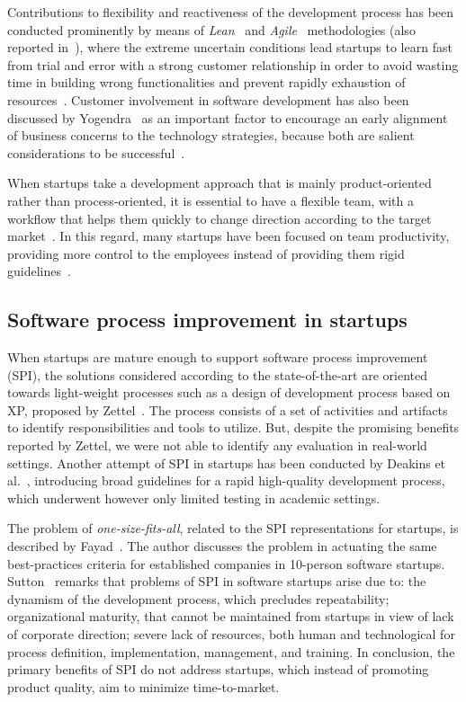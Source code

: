 \documentclass[10pt,journal,letterpaper,compsoc]{IEEEtran}
\begin{document}
Contributions to flexibility and reactiveness of the development process has 
been conducted prominently by means of \textit{Lean}~\cite{Gautam2008} and 
\textit{Agile}~\cite{Abrahamsson2002} methodologies (also reported 
in~\cite{Taipale2010, Kuvinka2011}), where the extreme uncertain conditions lead 
startups to learn fast from trial and error with a strong customer 
relationship in order to avoid wasting time in building wrong functionalities 
and prevent rapidly exhaustion of resources~\cite{Midler2008,Hilmola2003, 
Sutton2000}. Customer involvement in software development has also been 
discussed by Yogendra~\cite{Yogendra2002} as an important factor to encourage an 
early alignment of business concerns to the technology strategies, because both 
are salient considerations to be successful~\cite{Tingling2007}.

When startups take a development approach that is mainly product-oriented
rather than process-oriented, it is essential to have a flexible team, with a
workflow that helps them quickly to change direction according to the target
market~\cite{Sutton2000}. In this regard, many startups have been focused on
team productivity, providing more control to the employees instead of providing
them rigid guidelines~\cite{Tanabian2005, Chorev2006, Kakati2003}.

\subsection{Software process improvement in startups}

When startups are mature enough to support software process improvement (SPI),
the solutions considered according to the state-of-the-art are oriented towards
light-weight processes such as a design of development process based on XP,
proposed by Zettel~\cite{Zettel2001}. The process consists of a set of
activities and artifacts to identify responsibilities and tools to utilize. But, 
despite the promising benefits reported by Zettel, we were not able to identify 
any evaluation in real-world settings. Another attempt of SPI in startups has 
been conducted by Deakins et al.~\cite{Deakins2005}, introducing broad
guidelines for a rapid high-quality development process, which underwent 
however only limited testing in academic settings.

The problem of \textit{one-size-fits-all}, related to the SPI representations
for startups, is described by Fayad~\cite{Fayad1997}. The author discusses the
problem in actuating the same best-practices criteria for established
companies in 10-person software startups. Sutton~\cite{Sutton2000} remarks that 
problems of SPI in software startups arise due to: the dynamism of the 
development process, which precludes repeatability; organizational maturity, 
that cannot be maintained from startups in view of lack of corporate direction; 
severe lack of resources, both human and technological for process definition, 
implementation, management, and training. In conclusion, the primary benefits 
of SPI do not address startups, which instead of promoting product quality, aim 
to minimize time-to-market.
\end{document}

